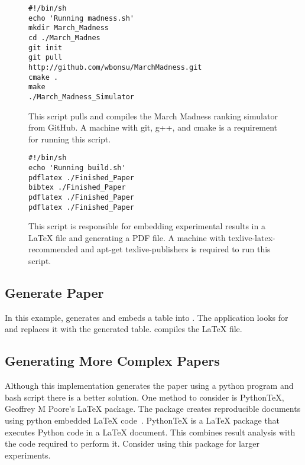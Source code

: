 \documentclass{IEEEtran}
\begin{document}
\begin{figure}[h]
\centering
\begin{mdframed}
\small
\begin{verbatim}
#!/bin/sh
echo 'Running madness.sh'
mkdir March_Madness
cd ./March_Madnes
git init 
git pull 
http://github.com/wbonsu/MarchMadness.git
cmake .
make
./March_Madness_Simulator

\end{verbatim}
\end{mdframed}
\caption{\footnotesize This script pulls and compiles the March Madness ranking simulator from GitHub. A machine with git, g++, and cmake is a requirement for running this script.}
\label{madness.sh}
\end{figure}

\begin{figure}[h]
\centering
\begin{mdframed}
\small
\begin{verbatim}
#!/bin/sh
echo 'Running build.sh'
pdflatex ./Finished_Paper
bibtex ./Finished_Paper
pdflatex ./Finished_Paper
pdflatex ./Finished_Paper

\end{verbatim}
\end{mdframed}
\caption{\footnotesize This script is responsible for embedding experimental results in a LaTeX file and generating a PDF file. A machine with texlive-latex-recommended and apt-get texlive-publishers is required to run this script. }
\label{build.sh}
\end{figure}

\subsection{Generate Paper}
In this example,  generates and embeds a table into . The application looks for
 and replaces it with the generated table.  compiles the LaTeX file.

\subsection{Generating More Complex Papers} 
Although this implementation generates the paper using a python program and bash script there is a better solution. 
One method to consider is PythonTeX, Geoffrey M Poore's LaTeX package. The package creates reproducible documents using python embedded LaTeX code~\cite{pytex}. PythonTeX is a LaTeX package that executes Python code in a LaTeX document. This combines result analysis with the code required to perform it. Consider using this package for larger experiments. 
\end{document}
